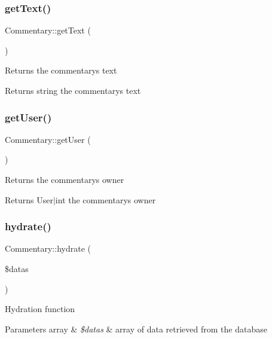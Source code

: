 \subsubsection{\texorpdfstring{get\+Text()}{getText()}}
{\footnotesize\ttfamily Commentary\+::get\+Text (\begin{DoxyParamCaption}{ }\end{DoxyParamCaption})}

Returns the commentary\textquotesingle{}s text \begin{DoxyReturn}{Returns}
string the commentary\textquotesingle{}s text 
\end{DoxyReturn}
\mbox{\label{classCommentary_ab2dd4b2b29ff4d33adc6b8e87e3e0152}} 
\subsubsection{\texorpdfstring{get\+User()}{getUser()}}
{\footnotesize\ttfamily Commentary\+::get\+User (\begin{DoxyParamCaption}{ }\end{DoxyParamCaption})}

Returns the commentary\textquotesingle{}s owner \begin{DoxyReturn}{Returns}
User$\vert$int the commentary\textquotesingle{}s owner 
\end{DoxyReturn}
\mbox{\label{classCommentary_a8409d077db22965fe9c75644aead31fa}} 
\subsubsection{\texorpdfstring{hydrate()}{hydrate()}}
{\footnotesize\ttfamily Commentary\+::hydrate (\begin{DoxyParamCaption}\item[{}]{\$datas }\end{DoxyParamCaption})\hspace{0.3cm}{\ttfamily [protected]}}

Hydration function 
\begin{DoxyParams}[1]{Parameters}
array & {\em \$datas} & array of data retrieved from the database \\
\hline
\end{DoxyParams}
\mbox{\label{classCommentary_aceef84b98f12d43f29b75dfb6288184e}} 
